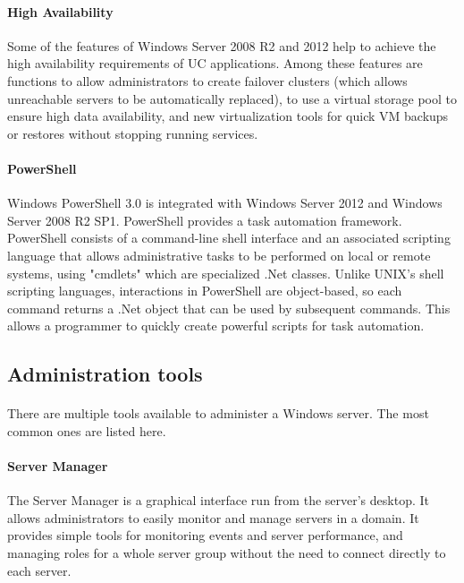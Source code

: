 \paragraph{High Availability}
Some of the features of Windows Server 2008 R2 and 2012 help to achieve the high availability requirements of UC applications. Among these features are functions to allow administrators to create failover clusters (which allows unreachable servers to be automatically replaced), to use a virtual storage pool to ensure high data availability, and new virtualization tools for quick VM backups or restores without stopping running services.

\paragraph{PowerShell}
Windows PowerShell 3.0 is integrated with Windows Server 2012 and Windows Server 2008 R2 SP1. PowerShell provides a task automation framework. PowerShell consists of a command-line shell interface and an associated scripting language that allows administrative tasks to be performed on local or remote systems, using "cmdlets" which are specialized .Net classes. Unlike UNIX's shell scripting languages, interactions in PowerShell are object-based, so each command returns a .Net object that can be used by subsequent commands. This allows a programmer to quickly create powerful scripts for task automation.


\subsection{Administration tools}
\paragraph{}
There are multiple tools available to administer a Windows server. The most common ones are listed here.


\paragraph{Server Manager}
The Server Manager is a graphical interface run from the server's desktop. It allows administrators to easily monitor and manage servers in a domain. It provides simple tools for monitoring events and server performance, and managing roles for a whole server group without the need to connect directly to each server.

